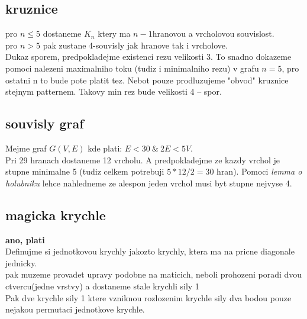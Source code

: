 \documentclass[a4paper]{article}
\begin{document}
\subsection{kruznice}
pro $n \leq 5$ dostaneme $K_n$ ktery ma $n-1$hranovou a vrcholovou souvislost.\\
pro $n > 5$ pak zustane 4-souvisly jak hranove tak i vrcholove.\\ 
Dukaz sporem, predpokladejme existenci rezu velikosti 3.
To snadno dokazeme pomoci nalezeni maximalniho toku
(tudiz i minimalniho rezu) v grafu $n=5$, pro ostatni n to bude pote platit tez.
Nebot pouze prodluzujeme "obvod" kruznice stejnym patternem. Takovy
min rez bude velikosti 4 -- spor.


\subsection{souvisly graf}
Mejme graf $G(V,E)$ kde plati: $E<30~\&~2E < 5V$.\\
Pri 29 hranach dostaneme 12 vrcholu. A predpokladejme ze kazdy
vrchol je stupne minimalne 5 (tudiz celkem potrebuji $5*12/2=30$ hran).
Pomoci \textit{lemma o holubniku} lehce nahledneme ze
alespon jeden vrchol musi byt stupne nejvyse 4.


\subsection{magicka krychle}
\textbf{ano, plati}\\
Definujme si jednotkovou krychly jakozto krychly, ktera ma na pricne diagonale
jednicky.\\
pak muzeme provadet upravy podobne na maticich, neboli prohozeni poradi dvou
ctvercu(jedne vrstvy) a dostaneme stale krychli sily 1\\
Pak dve krychle sily 1 ktere vzniknou rozlozenim krychle sily dva bodou pouze
nejakou permutaci jednotkove krychle.
\end{document}
